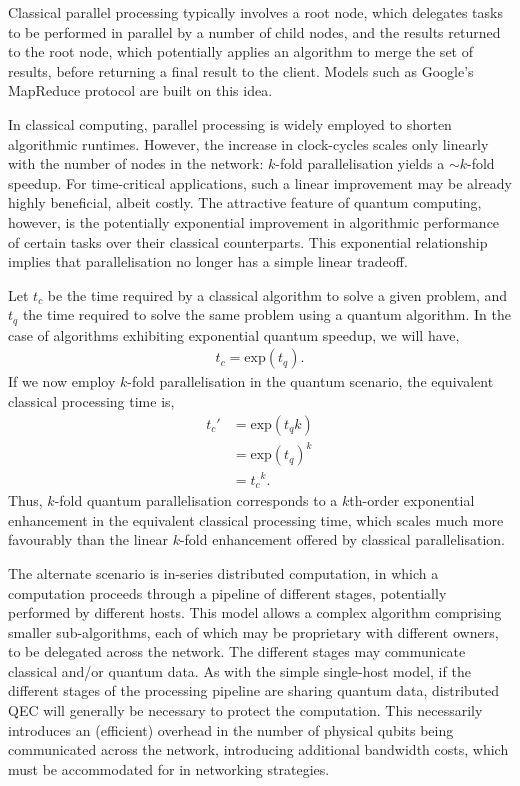 \documentclass[aps,rmp,twocolumn,amsmath,amssymb,nofootinbib,superscriptaddress,longbibliography,floatfix]{revtex4-1}
\begin{document}
Classical parallel processing typically involves a root node, which delegates tasks to be performed in parallel by a number of child nodes, and the results returned to the root node, which potentially applies an algorithm to merge the set of results, before returning a final result to the client. Models such as Google's {\sc MapReduce} protocol \cite{bib:MapReduce} are built on this idea.

In classical computing, parallel processing is widely employed to shorten algorithmic runtimes. However, the increase in clock-cycles scales only linearly with the number of nodes in the network: $k$-fold parallelisation yields a \mbox{$\sim k$}-fold speedup. For time-critical applications, such a linear improvement may be already highly beneficial, albeit costly. The attractive feature of quantum computing, however, is the potentially exponential improvement in algorithmic performance of certain tasks over their classical counterparts. This exponential relationship implies that parallelisation no longer has a simple linear tradeoff.

Let $t_c$ be the time required by a classical algorithm to solve a given problem, and $t_q$ the time required to solve the same problem using a quantum algorithm. In the case of algorithms exhibiting exponential quantum speedup, we will have,
\begin{align}
t_c = \mathrm{exp}(t_q).
\end{align}
If we now employ $k$-fold parallelisation in the quantum scenario, the equivalent classical processing time is,
\begin{align}
t_c' &= \mathrm{exp}(t_q k) \nonumber \\
&= \mathrm{exp}(t_q)^{k} \nonumber \\
&= {t_c}^{k}.
\end{align}
Thus, $k$-fold quantum parallelisation corresponds to a $k$th-order exponential enhancement in the equivalent classical processing time, which scales much more favourably than the linear $k$-fold enhancement offered by classical parallelisation.

The alternate scenario is in-series distributed computation, in which a computation proceeds through a pipeline of different stages, potentially performed by different hosts. This model allows a complex algorithm comprising smaller sub-algorithms, each of which may be proprietary with different owners, to be delegated across the network. The different stages may communicate classical and/or quantum data. As with the simple single-host model, if the different stages of the processing pipeline are sharing quantum data, distributed QEC will generally be necessary to protect the computation. This necessarily introduces an (efficient) overhead in the number of physical qubits being communicated across the network, introducing additional bandwidth costs, which must be accommodated for in networking strategies.
\end{document}
